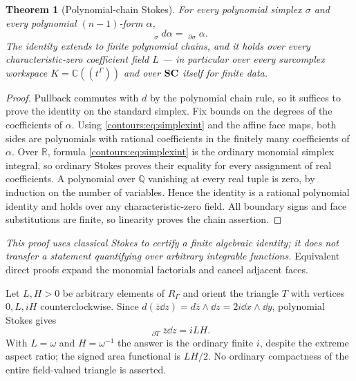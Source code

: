 \documentclass[11pt,letterpaper]{article}
\newtheorem{theorem}{Theorem}[section]
\theoremstyle{definition}
\theoremstyle{remark}
\newcommand{\R}{\mathbb R}\newcommand{\C}{\mathbb C}\newcommand{\Q}{\mathbb Q}
\newcommand{\PInt}{\mathop{\int^{\!\mathrm{pol}}}\nolimits}
\numberwithin{equation}{section}
\begin{document}
\begin{theorem}[Polynomial-chain Stokes]\label{contours:thm:polstokes}
For every polynomial simplex $\sigma$ and every polynomial $(n-1)$-form $\alpha$,
\begin{equation}\label{contours:eq:polstokes}
  \PInt_\sigma d\alpha=\PInt_{\partial\sigma}\alpha .
\end{equation}
The identity extends to finite polynomial chains, and it holds over every
characteristic-zero coefficient field $L$ --- in particular over every surcomplex
workspace $K=\C((t^\Gamma))$ and over $\mathbf{SC}$ itself for finite data.
\end{theorem}
\begin{proof}
Pullback commutes with $d$ by the polynomial chain rule, so it suffices to prove
the identity on the standard simplex. Fix bounds on the degrees of the coefficients
of $\alpha$. Using \eqref{contours:eq:simplexint} and the affine face maps, both
sides are polynomials with rational coefficients in the finitely many coefficients
of $\alpha$. Over $\R$, formula \eqref{contours:eq:simplexint} is the ordinary
monomial simplex integral, so ordinary Stokes proves their equality for every
assignment of real coefficients. A polynomial over $\Q$ vanishing at every real
tuple is zero, by induction on the number of variables. Hence the identity is a
rational polynomial identity and holds over any characteristic-zero field. All
boundary signs and face substitutions are finite, so linearity proves the chain
assertion.
\end{proof}

\emph{This proof uses classical Stokes to certify a finite algebraic identity; it
does not transfer a statement quantifying over arbitrary integrable functions.}
Equivalent direct proofs expand the monomial factorials and cancel adjacent faces.

\begin{example}\label{contours:ex:triangle}
Let $L,H>0$ be arbitrary elements of $R_\Gamma$ and orient the triangle $T$ with
vertices $0,L,iH$ counterclockwise. Since
$d(\bar z\dd z)=d\bar z\wedge \dd z=2i\dd x\wedge \dd y$, polynomial Stokes gives
\begin{equation}\label{contours:eq:triangle}
  \PInt_{\partial T}\bar z\dd z=iLH .
\end{equation}
With $L=\omega$ and $H=\omega^{-1}$ the answer is the ordinary finite $i$, despite
the extreme aspect ratio; the signed area functional is $LH/2$. No ordinary
compactness of the entire field-valued triangle is asserted.
\end{example}
\end{document}
